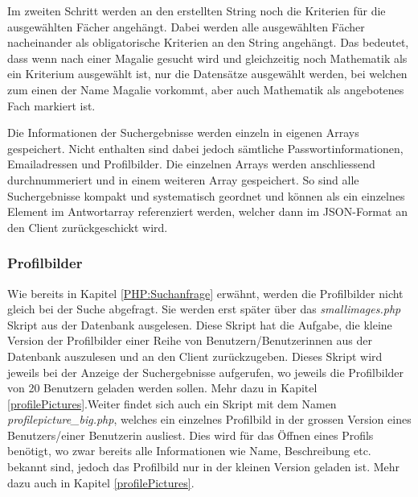 \documentclass[../main.tex]{subfiles}
\begin{document}
	 Im zweiten Schritt werden an den erstellten String noch die Kriterien für die ausgewählten Fächer angehängt. Dabei werden alle ausgewählten Fächer nacheinander als obligatorische Kriterien an den String angehängt. Das bedeutet, dass wenn nach einer \glqq Magalie\grqq{} gesucht wird und gleichzeitig noch Mathematik als ein Kriterium ausgewählt ist, nur die Datensätze ausgewählt werden, bei welchen zum einen der Name \glqq Magalie\grqq{} vorkommt, aber auch Mathematik als angebotenes Fach markiert ist.
	 
	 Die Informationen der Suchergebnisse werden einzeln in eigenen Arrays gespeichert. Nicht enthalten sind dabei jedoch sämtliche Passwortinformationen, Emailadressen und Profilbilder. Die einzelnen Arrays werden anschliessend durchnummeriert und in einem weiteren Array gespeichert. So sind alle Suchergebnisse kompakt und systematisch geordnet und können als ein einzelnes Element im Antwortarray referenziert werden, welcher dann im JSON-Format an den Client zurückgeschickt wird.
	 
	 \subsubsection{Profilbilder}
	 Wie bereits in Kapitel \ref{PHP:Suchanfrage} erwähnt, werden die Profilbilder nicht gleich bei der Suche abgefragt. Sie werden erst später über das \emph{smallimages.php} Skript aus der Datenbank ausgelesen. Diese Skript hat die Aufgabe, die kleine Version der Profilbilder einer Reihe von Benutzern/Benutzerinnen aus der Datenbank auszulesen und an den Client zurückzugeben. Dieses Skript wird jeweils bei der Anzeige der Suchergebnisse aufgerufen, wo jeweils die Profilbilder von 20 Benutzern geladen werden sollen. Mehr dazu in Kapitel \ref{profilePictures}.\newline\newline Weiter findet sich auch ein Skript mit dem Namen \emph{profilepicture\_big.php}, welches ein einzelnes Profilbild  in der grossen Version eines Benutzers/einer Benutzerin ausliest. Dies wird für das Öffnen eines Profils benötigt, wo zwar bereits alle Informationen wie Name, Beschreibung etc. bekannt sind, jedoch das Profilbild nur in der kleinen Version geladen ist. Mehr dazu auch in Kapitel \ref{profilePictures}.
	 
\end{document}
